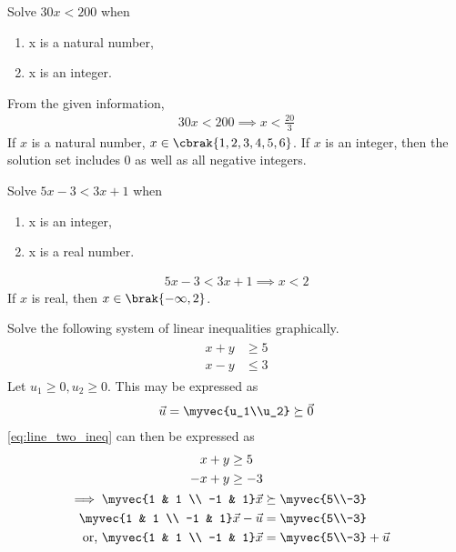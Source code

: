     \item Solve $30x < 200$ when
    \begin{enumerate} 
    \item  x is a natural number,
    \item x is an integer.
\end{enumerate}
\solution From the given information, 
\begin{align}
30x < 200 \implies x < \frac{20}{3}
\label{eq:lineq_nat}
\end{align}
If $x$ is a natural number, $x \in \cbrak{1, 2, 3, 4, 5, 6}$. If $x$ is an integer, then the solution set includes 0 as well as all negative integers.
    \item Solve $5x-3 < 3x+1$ when
    \begin{enumerate} 
\item  x is an integer,
    \item x is a real number.
\end{enumerate}
\solution 
\begin{align}
5x-3 < 3x+1 \implies x < 2
\label{eq:lineq_real}
\end{align}
%
If $x$ is real, then $x \in \brak{-\infty, 2}$. 
    \item Solve the following system of linear inequalities graphically.
\begin{align}
\label{eq:line_two_ineq}
\begin{split}
    x+y &\geq 5
\\
    x-y &\leq 3
\end{split}
\end{align}
\solution  Let $u_1 \ge 0, u_2 \ge 0$.  This may be expressed as
\begin{align}
\vec{u} = \myvec{u_1\\u_2}\succeq \vec{0}
\end{align}
%
\eqref{eq:line_two_ineq} can then be expressed as
\begin{align}
\begin{split}
    x+y &\geq 5
\\
    -x+y &\geq -3
\end{split}
%
\\
\implies 
\myvec{1 & 1 \\ -1 & 1}\vec{x}  &\succeq \myvec{5\\-3}
\\
\myvec{1 & 1 \\ -1 & 1}\vec{x}  -\vec{u}&=\myvec{5\\-3}
\\
\text{or, }
\myvec{1 & 1 \\ -1 & 1}\vec{x} &= \myvec{5\\-3} +\vec{u}
\end{align}
